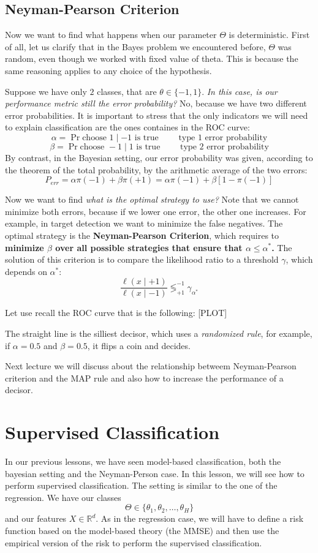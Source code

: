 \subsection{Neyman-Pearson Criterion}
Now we want to find what happens when our parameter $\Theta$ is deterministic. First of all, let us clarify that in the Bayes problem we encountered before, $\Theta$ was random, even though we worked with fixed value of theta. This is because the same reasoning applies to any choice of the hypothesis.

Suppose we have only $2$ classes, that are $\theta \in \{-1, 1\}$. \textit{In this case, is our performance metric still the error probability?} No, because we have two different error probabilities. It is important to stress that the only indicators we will need to explain classification are the ones containes in the ROC curve:
\[
    \alpha = \Pr{\text{choose } 1 \mid -1\text{ is true}} \qquad \text{ type 1 error probability}
\]
\[
    \beta = \Pr{\text{choose } -1 \mid 1\text{ is true}} \qquad \text{ type 2 error probability}
\]
By contrast, in the Bayesian setting, our error probability was given, according to the theorem of the total probability, by the arithmetic average of the two errors:
\[
    P_{err} = \alpha \pi(-1) + \beta \pi(+1) = \alpha \pi(-1) + \beta [1-\pi(-1)]
\]

Now we want to find \textit{what is the optimal strategy to use?} Note that we cannot minimize both errors, because if we lower one error, the other one increases. For example, in target detection we want to minimize the false negatives. The optimal strategy is the \textbf{Neyman-Pearson Criterion}, which requires to \textbf{minimize $\beta$ over all possible strategies that ensure that $\alpha \leq \alpha^\ast$.}
The solution of this criterion is to compare the likelihood ratio to a threshold $\gamma$, which depends on $\alpha^\ast$:
\[
    \frac{\ell(x \mid +1)}{\ell(x \mid -1)} \lessgtr^{-1}_{+1} \gamma_{\alpha^\ast}
\]

Let use recall the ROC curve that is the following:
[PLOT]

The straight line is the silliest decisor, which uses a \textit{randomized rule}, for example, if $\alpha=0.5$ and $\beta=0.5$, it flips a coin and decides.

Next lecture we will discuss about the relationship betweem Neyman-Pearson criterion and the MAP rule and also how to increase the performance of a decisor.

\section{Supervised Classification}
In our previous lessons, we have seen model-based classification, both the bayesian setting and the Neyman-Person case. In this lesson, we will see how to perform supervised classification. The setting is similar to the one of the regression.
We have our classes
\[
    \Theta \in \{\theta_1, \theta_2, \dots, \theta_H\}
\]
and our features $X \in \mathbb{R}^d$. As in the regression case, we will have to define a risk function based on the model-based theory (the MMSE) and then use the empirical version of the risk to perform the supervised classification.

